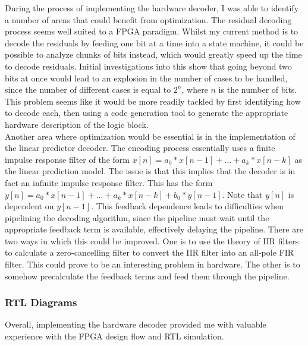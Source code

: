 \documentclass[12pt]{scrartcl}
\begin{document}
  During the process of implementing the hardware decoder, I was able to identify a number of areas that could benefit from optimization. The residual decoding process seems well suited to a FPGA paradigm. Whilst my current method is to decode the residuals by feeding one bit at a time into a state machine, it could be possible to analyze chunks of bits instead, which would greatly speed up the time to decode residuals. Initial investigations into this show that going beyond two bits at once would lead to an explosion in the number of cases to be handled, since the number of different cases is equal to \(2^{n}\), where \(n\) is the number of bits. This problem seems like it would be more readily tackled by first identifying how to decode each, then using a code generation tool to generate the appropriate hardware description of the logic block. \\
      
  Another area where optimization would be essential is in the implementation of the linear predictor decoder. The encoding process essentially uses a finite impulse response filter of the form \(x[n] = a_0*x[n-1] + ... + a_k*x[n-k]\) as the linear prediction model. The issue is that this implies that the decoder is in fact an infinite impulse response filter. This has the form \(y[n] = a_0*x[n - 1] + ... + a_k*x[n-k] + b_0*y[n - 1]\). Note that \(y[n]\) is dependent on \(y[n-1]\). This feedback dependence leads to difficulties when pipelining the decoding algorithm, since the pipeline must wait until the appropriate feedback term is available, effectively delaying the pipeline. There are two ways in which this could be improved. One is to use the theory of IIR filters to calculate a zero-cancelling filter to convert the IIR filter into an all-pole FIR filter. This could prove to be an interesting problem in hardware. The other is to somehow precalculate the feedback terms and feed them through the pipeline. \\ 
      
  \subsubsection{RTL Diagrams}
      
      

  Overall, implementing the hardware decoder provided me with valuable experience with the FPGA design flow and RTL simulation.
  
\end{document}

